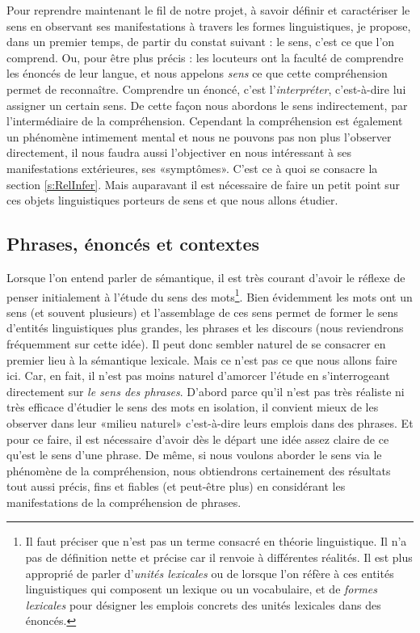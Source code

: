 \begin{refsegment}
Pour reprendre maintenant le fil de notre projet, à savoir définir et caractériser le sens en observant ses manifestations à travers les formes linguistiques, je propose, dans un premier temps, de partir du constat suivant : le sens, c'est ce que l'on comprend. Ou, pour être plus précis : les locuteurs ont la faculté de comprendre les énoncés de leur langue, et nous appelons \emph{sens} ce que cette compréhension permet de reconnaître.  Comprendre un énoncé, c'est l'\emph{interpréter}, c'est-à-dire lui assigner un certain sens.
De cette façon nous abordons le sens indirectement, par l'intermédiaire  de la compréhension.  Cependant la compréhension est également un phénomène intimement mental et nous ne pouvons pas non plus l'observer directement, il nous faudra aussi l'objectiver en nous intéressant à ses manifestations extérieures, ses «symptômes».  C'est ce à quoi se consacre la section \ref{s:RelInfer}.  Mais auparavant il est nécessaire de faire un petit point sur ces objets linguistiques porteurs de sens et que nous allons étudier.





\subsection{Phrases, énoncés et contextes}

Lorsque l'on entend parler de sémantique, il est très courant d'avoir le réflexe de penser %
initialement
à l'étude du sens des mots\footnote{Il faut préciser que  n'est pas un terme consacré en théorie linguistique. Il n'a pas de définition nette et précise car il renvoie à différentes réalités. Il est plus approprié de parler d'\emph{unités lexicales} ou de  lorsque l'on réfère à ces entités linguistiques qui composent un lexique ou un vocabulaire, et de \emph{formes lexicales} pour désigner les emplois concrets des unités lexicales dans des énoncés.}. 
Bien évidemment les mots ont un sens (et souvent plusieurs) et l'assemblage de ces sens permet de former le sens d'entités linguistiques plus grandes, les phrases et les discours (nous reviendrons fréquemment sur cette idée).  Il peut donc sembler naturel de se consacrer en premier lieu à la sémantique lexicale.  Mais ce n'est pas ce que nous allons faire ici.
Car, en fait, il n'est pas moins naturel d'amorcer l'étude en s'interrogeant directement sur \emph{le sens des phrases}. D'abord parce qu'il n'est pas très réaliste ni très efficace d'étudier le sens des mots en isolation, il convient mieux de les observer dans leur «milieu naturel» c'est-à-dire leurs emplois dans des phrases.  Et pour ce faire, il est nécessaire d'avoir dès le départ une idée assez claire de ce qu'est le sens d'une phrase.  De même, si nous voulons aborder le sens via le phénomène de la compréhension, nous obtiendrons certainement des résultats tout aussi  précis, fins  et fiables (et peut-être plus) en considérant les manifestations de la compréhension de phrases. 


\end{refsegment}
